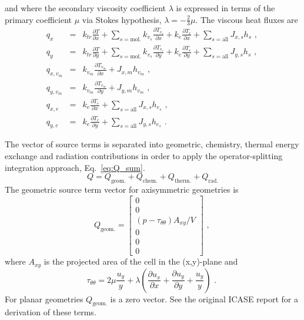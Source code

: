 and where the secondary viscosity coefficient $\lambda$ is expressed 
in terms of the primary coefficient $\mu$ via Stokes hypothesis, $\lambda = - \frac{2}{3} \mu$. 
The viscous heat fluxes are
\begin{eqnarray}
 q_{x} &=& k_{tr} \frac{\partial T}{\partial x} + \sum_{s=\text{mol.}} k_{v_{s}} \frac{\partial T_{v_{s}}}{\partial x} + k_{e} \frac{\partial T_{e}}{\partial x} + \sum_{s=\text{all}}{ J_{x,s} h_{s} } \text{ , } \nonumber \\
 q_{y} &=& k_{tr} \frac{\partial T}{\partial y} + \sum_{s=\text{mol.}} k_{v_{s}} \frac{\partial T_{v_{s}}}{\partial y} + k_{e} \frac{\partial T_{e}}{\partial y} + \sum_{s=\text{all}}{ J_{y,s} h_{s} } \text{ , } \nonumber \\
 q_{x,v_{m}} &=& k_{v_{m}} \frac{\partial T_{v_{m}}}{\partial x} + J_{x,m} h_{v_{m}} \text{ , } \nonumber \\
 q_{y,v_{m}} &=& k_{v_{m}} \frac{\partial T_{v_{m}}}{\partial y} + J_{y,m} h_{v_{m}} \text{ , } \nonumber \\
 q_{x,e} &=& k_{e} \frac{\partial T_{e}}{\partial x} + \sum_{s=\text{all}}{ J_{x,s} h_{e_{s}} } \text{ , } \nonumber \\
 q_{y,e} &=& k_{e} \frac{\partial T_{e}}{\partial y} + \sum_{s=\text{all}}{ J_{y,s} h_{e_{s}} } \text{ . } \label {eq:qs}
\end{eqnarray}

\medskip
The vector of source terms is separated into geometric, chemistry, thermal energy exchange and radiation contributions 
in order to apply the operator-splitting integration approach, Eq.~\ref{eq:Q_sum}.
\begin{equation}
 Q = Q_{\text{geom.}} + Q_{\text{chem.}} + Q_{\text{therm.}} + Q_{\text{rad.}}
 \label{eq:Q_sum}
\end{equation}
The geometric source term vector for axisymmetric geometries is
\begin{equation}
 Q_{\text{geom.}} = \left [ \begin{array}{c} 0 \\ 0 \\ \left ( p - \tau_{\theta \theta} \right ) A_{xy} / V \\ 0 \\ 0 \\ 0 \end{array} \right ] \text{ , }
 \label{eq:Q_geom}
\end{equation}
where $A_{xy}$ is the projected area of the cell in the (x,y)-plane and 
\begin{equation}
 \tau_{\theta\theta} = 2 \mu \frac{u_{y}}{y} + \lambda \left ( \frac{\partial u_{x} }{\partial x} + \frac{\partial u_{y} }{\partial y} + \frac{u_{y}}{y} \right ) \text{ . }
 \label{eq:tau00}
\end{equation}
For planar geometries $Q_{\text{geom.}}$ is a zero vector.
See the original ICASE report \cite{jacobs_91d} for a derivation of these terms.

